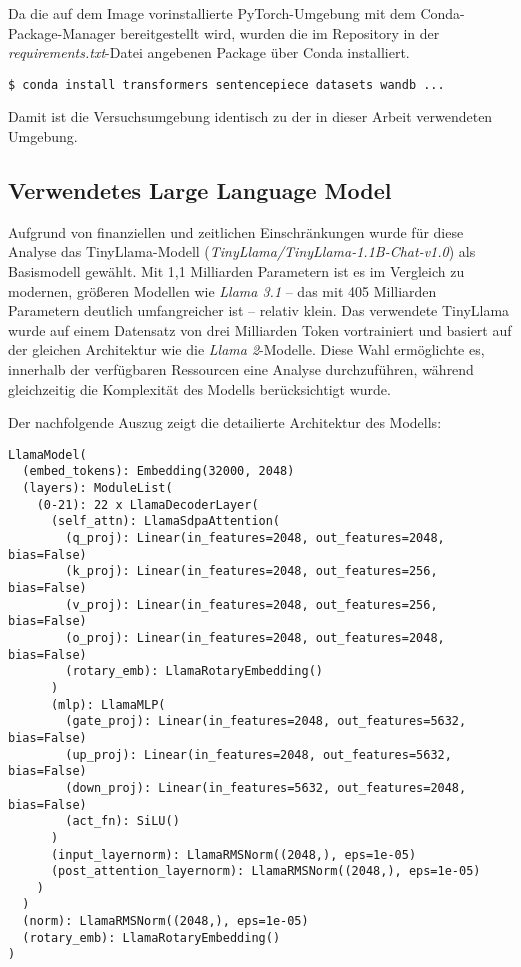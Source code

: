Da die auf dem Image vorinstallierte PyTorch-Umgebung mit dem
Conda-Package-Manager bereitgestellt wird, wurden die im Repository in der
\emph{requirements.txt}-Datei angebenen Package über Conda installiert.

\vspace{1em}
\begin{lstlisting}
$ conda install transformers sentencepiece datasets wandb ...
\end{lstlisting}

Damit ist die Versuchsumgebung identisch zu der in dieser Arbeit verwendeten
Umgebung.

\subsection{Verwendetes Large Language Model}

Aufgrund von finanziellen und zeitlichen Einschränkungen wurde für diese Analyse
das TinyLlama-Modell (\emph{TinyLlama/TinyLlama-1.1B-Chat-v1.0}) als Basismodell
gewählt. Mit 1,1 Milliarden Parametern ist es im Vergleich zu modernen, größeren
Modellen wie \emph{Llama 3.1} – das mit 405 Milliarden Parametern deutlich
umfangreicher ist – relativ klein. Das verwendete TinyLlama wurde auf einem
Datensatz von drei Milliarden Token vortrainiert und basiert auf der gleichen
Architektur wie die \emph{Llama 2}-Modelle. Diese Wahl ermöglichte es, innerhalb
der verfügbaren Ressourcen eine Analyse durchzuführen, während gleichzeitig die
Komplexität des Modells berücksichtigt wurde.

Der nachfolgende Auszug zeigt die detailierte Architektur des Modells:

\vspace{1em}
\begin{lstlisting}
LlamaModel(
  (embed_tokens): Embedding(32000, 2048)
  (layers): ModuleList(
    (0-21): 22 x LlamaDecoderLayer(
      (self_attn): LlamaSdpaAttention(
        (q_proj): Linear(in_features=2048, out_features=2048, bias=False)
        (k_proj): Linear(in_features=2048, out_features=256, bias=False)
        (v_proj): Linear(in_features=2048, out_features=256, bias=False)
        (o_proj): Linear(in_features=2048, out_features=2048, bias=False)
        (rotary_emb): LlamaRotaryEmbedding()
      )
      (mlp): LlamaMLP(
        (gate_proj): Linear(in_features=2048, out_features=5632, bias=False)
        (up_proj): Linear(in_features=2048, out_features=5632, bias=False)
        (down_proj): Linear(in_features=5632, out_features=2048, bias=False)
        (act_fn): SiLU()
      )
      (input_layernorm): LlamaRMSNorm((2048,), eps=1e-05)
      (post_attention_layernorm): LlamaRMSNorm((2048,), eps=1e-05)
    )
  )
  (norm): LlamaRMSNorm((2048,), eps=1e-05)
  (rotary_emb): LlamaRotaryEmbedding()
)
\end{lstlisting}

